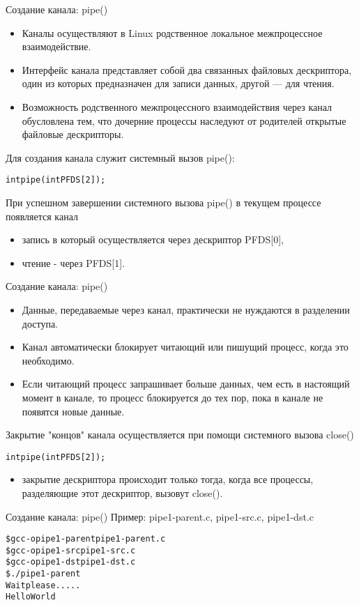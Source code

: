 \documentclass{beamer}
\begin{document}
\begin{frame}[fragile]{Создание канала: pipe()}
\begin{itemize}
\item Каналы осуществляют в Linux родственное локальное межпроцессное взаимодействие. 
\item Интерфейс канала представляет собой два связанных файловых дескриптора, один из которых предназначен для записи данных, другой — для чтения. 
\item Возможность родственного межпроцессного взаимодействия через канал обусловлена тем, что дочерние процессы наследуют от родителей открытые файловые дескрипторы.
\end{itemize}
Для создания канала служит системный вызов pipe():
\begin{alltt}
int pipe (int PFDS[2]);
\end{alltt}
При успешном завершении системного вызова pipe() в текущем процессе появляется канал
\begin{itemize}
\item запись в который осуществляется через дескриптор PFDS[0], 
\item чтение - через PFDS[1]. 
\end{itemize}
\end{frame}

\begin{frame}[fragile]{Создание канала: pipe()}
\begin{itemize}
\item Данные, передаваемые через канал, практически не нуждаются в разделении доступа. 
\item Канал автоматически блокирует читающий или пишущий процесс, когда это
необходимо. 
\item Если читающий процесс запрашивает больше данных, чем есть в настоящий момент в канале, то процесс блокируется до тех пор, пока в канале не появятся новые данные.
\end{itemize}
Закрытие "концов" канала осуществляется при помощи системного вызова close()
\begin{alltt}
int pipe (int PFDS[2]);
\end{alltt}
\begin{itemize}
\item закрытие дескриптора происходит только тогда, когда все процессы, разделяющие этот дескриптор, вызовут close().
\end{itemize}
\end{frame}

\begin{frame}[fragile]{Создание канала: pipe()}
Пример: pipe1-parent.c, pipe1-src.c, pipe1-dst.c
\begin{alltt}
\$ gcc -o pipe1-parent pipe1-parent.c
\$ gcc -o pipe1-src pipe1-src.c
\$ gcc -o pipe1-dst pipe1-dst.c
\$ ./pipe1-parent
Wait please.....
Hello World
\end{alltt}
\end{frame}
\end{document}
